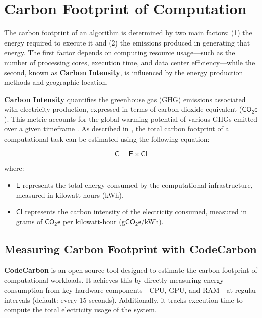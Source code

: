 \documentclass[a4paper,singleside,12pt]{report} %
\begin{document}
\section{Carbon Footprint of Computation}

The carbon footprint of an algorithm is determined by two main factors: (1) the energy required to execute it and (2) the emissions 
produced in generating that energy. The first factor depends on computing resource usage—such as the number of processing cores, 
execution time, and data center efficiency—while the second, known as \textbf{Carbon Intensity}, is influenced by the energy
 production methods and geographic location. 

\textbf{Carbon Intensity} quantifies the greenhouse gas (GHG) emissions associated with electricity production, expressed in terms 
of carbon dioxide equivalent ($\mathsf{CO_2e}$). This metric accounts for the global warming potential of various GHGs emitted over 
a given timeframe \cite{GreenAlgorithms}. As described in \cite{courty2024codecarbon}, the total carbon footprint of a computational 
task can be estimated using the following equation:

\begin{equation}
    \mathsf{C} = \mathsf{E} \times \mathsf{CI}
\end{equation}

where:

\begin{itemize}
    \item $\mathsf{E}$ represents the total energy consumed by the computational infrastructure, measured in kilowatt-hours (kWh).
    \item $\mathsf{CI}$ represents the carbon intensity of the electricity consumed, measured in grams of $\mathsf{CO_2e}$ per 
    kilowatt-hour (g$\mathsf{CO_2e}$/kWh).
\end{itemize}

\subsection{Measuring Carbon Footprint with CodeCarbon}

\textbf{CodeCarbon} is an open-source tool designed to estimate the carbon footprint of computational workloads. It achieves this 
by directly measuring energy consumption from key hardware components—CPU, GPU, and RAM—at regular intervals (default: every 15 
seconds). Additionally, it tracks execution time to compute the total electricity usage of the system.
\end{document}
